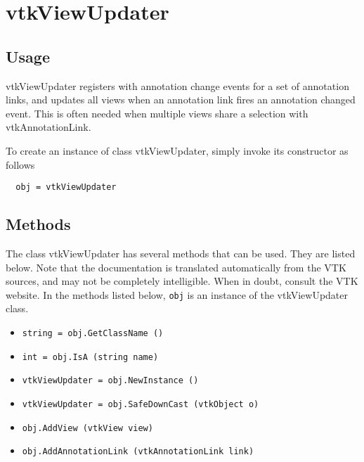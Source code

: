 \section{vtkViewUpdater}

\subsection{Usage}

 vtkViewUpdater registers with annotation change events for a set of
 annotation links, and updates all views when an annotation link fires an 
 annotation changed event. This is often needed when multiple views share 
 a selection with vtkAnnotationLink. 

To create an instance of class vtkViewUpdater, simply
invoke its constructor as follows
\begin{verbatim}
  obj = vtkViewUpdater
\end{verbatim}
\subsection{Methods}

The class vtkViewUpdater has several methods that can be used.
  They are listed below.
Note that the documentation is translated automatically from the VTK sources,
and may not be completely intelligible.  When in doubt, consult the VTK website.
In the methods listed below, \verb|obj| is an instance of the vtkViewUpdater class.
\begin{itemize}
\item  \verb|string = obj.GetClassName ()|

\item  \verb|int = obj.IsA (string name)|

\item  \verb|vtkViewUpdater = obj.NewInstance ()|

\item  \verb|vtkViewUpdater = obj.SafeDownCast (vtkObject o)|

\item  \verb|obj.AddView (vtkView view)|

\item  \verb|obj.AddAnnotationLink (vtkAnnotationLink link)|

\end{itemize}
